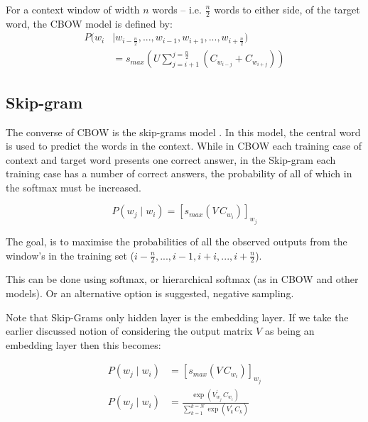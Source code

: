 \documentclass[parskip]{komatufte}
\begin{document}
For a context window of width $n$ words -- i.e. $\frac{n}{2}$ words to either side, of the target word,
the CBOW model is defined by:
\begin{align}
P(w_i & \mid w_{i-\frac{n}{2}},..., w_{i-1}, w_{i+1},...,w_{i+\frac{n}{2}})  \nonumber
\\  & = s_{max}(U \sum_{j=i+1}^{j=\frac{n}{2}} \left( C_{w_{i-j}}+C_{w_{i+j}} \right))
\end{align}




\subsection{Skip-gram}\label{sec:skip-gram}



The converse of CBOW is the skip-grams model .
In this model, the central word is used to predict the words in the context.
While in CBOW each training case of context and target word presents one correct answer,
in the Skip-gram each training case has a number of correct answers, the probability of all of which in the softmax must be increased.

\begin{equation}
P(w_j \mid w_{i}) = \left[ s_{max}(V\,C_{w_{i}}) \right]_{w_j} 
\end{equation}


The goal, is to maximise the probabilities of all the observed outputs from the window's in the training set ($i-\frac{n}{2},...,i-1, i+i,...,i+\frac{n}{2}$).


This can be done using softmax, or hierarchical softmax (as in CBOW and other models).
Or an alternative option is suggested, negative sampling.

Note that Skip-Grams only hidden layer is the embedding layer.
If we take the earlier discussed notion of considering the output matrix $V$ as being an embedding layer
then this becomes:

\begin{align}
P(w_j \mid w_{i}) & = \left[ s_{max}(V\,C_{w_{i}}) \right]_{w_j} \\
P(w_j \mid w_{i}) & = \frac{\exp(V_{w_j}^\prime\,C_{w_{i}})}{\sum_{k=1}^{k=N} \exp(V_k^\prime\,C_{k})}
\end{align}
\end{document}
